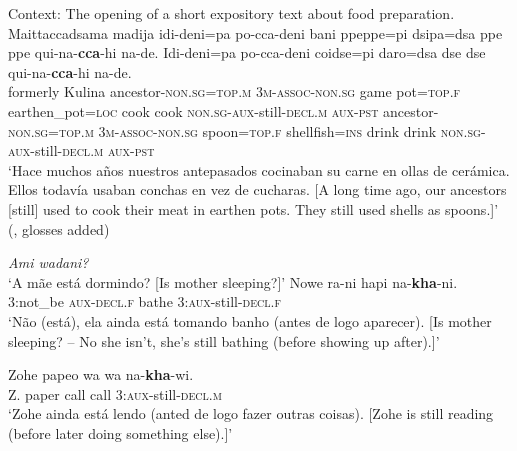 \begin{exe}
	\ex\label{exAppendixKulina1}
	Context: The opening of a short expository text about food preparation.\\
	\gll Maittaccadsama madija idi-deni=pa po-cca-deni bani ppeppe=pi dsipa=dsa ppe ppe qui-na-\textbf{cca}-hi na-de. Idi-deni=pa po-cca-deni coidse=pi daro=dsa dse dse qui-na-\textbf{cca}-hi na-de.\\
	formerly Kulina ancestor-\textsc{non}.\textsc{sg}=\textsc{top}.\textsc{m} 3\textsc{m}-\textsc{assoc}-\textsc{non}.\textsc{sg} game pot=\textsc{top}.\textsc{f} earthen\_pot=\textsc{loc} cook cook \textsc{non}.\textsc{sg}-\textsc{aux}-still-\textsc{decl}.\textsc{m} \textsc{aux}-\textsc{pst} ancestor-\textsc{non}.\textsc{sg}=\textsc{top}.\textsc{m} 3\textsc{m}-\textsc{assoc}-\textsc{non}.\textsc{sg} spoon=\textsc{top}.\textsc{f} shellfish=\textsc{ins} drink drink \textsc{non}.\textsc{sg}-\textsc{aux}-still-\textsc{decl}.\textsc{m} \textsc{aux}-\textsc{pst}\\
	\glt \lq Hace muchos años nuestros antepasados cocinaban su carne en ollas de cerámica. Ellos todavía usaban conchas en vez de cucharas. [A long time ago, our ancestors [still] used to cook their meat in earthen pots. They still used shells as spoons.]\rq{ }(\cite[49]{Boyer1999}, glosses added)

	\ex\label{exAppendixKulina2}
	\begin{xlist}
			 \textit{Ami wadani?}\\
			\lq A mãe está dormindo? [Is mother sleeping?]\rq{}
			\gll Nowe ra-ni hapi na-\textbf{kha}-ni.\\
			3:not\_be \textsc{aux}-\textsc{decl}.\textsc{f} bathe 3:\textsc{aux}-still-\textsc{decl}.\textsc{f}\\
			\glt \lq Não (está), ela ainda está tomando banho (antes de logo aparecer). [Is mother sleeping? -- No she isn’t, she's still bathing (before showing up after).]\rq{ }\parencite[184]{Tiss2004}
		\end{xlist}
	
	\ex\label{exAppendixKulina3}
	\gll Zohe papeo wa wa na-\textbf{kha}-wi.\\
	Z. paper call call 3:\textsc{aux}-still-\textsc{decl}.\textsc{m}\\
	\glt \lq Zohe ainda está lendo (anted de logo fazer outras coisas). [Zohe is still reading (before later doing something else).]\rq{ }\parencite[184]{Tiss2004} 
\end{exe}


